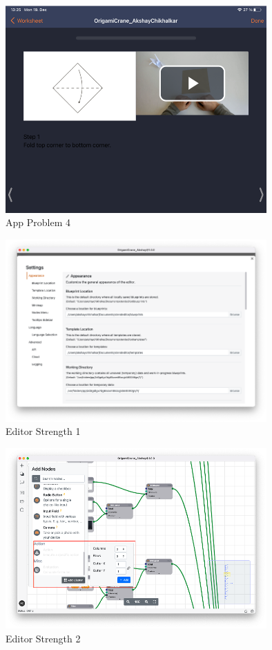 \documentclass[conference,onecolumn]{IEEEtran}
\begin{document}
    \begin{figure}[H]
        \centerline{\includegraphics[width=100mm,scale=1]{./images/App_Problem_4.png}}
        \caption{App Problem 4}
        \label{App Problem 4}
    \end{figure}
    \begin{figure}[H]
        \centerline{\includegraphics[width=100mm,scale=1]{./images/Editor_Strength_1.png}}
        \caption{Editor Strength 1}
        \label{Editor Strength 1}
    \end{figure}
    \begin{figure}[H]
        \centerline{\includegraphics[width=100mm,scale=1]{./images/Editor_Strength_2.png}}
        \caption{Editor Strength 2}
        \label{Editor Strength 2}
    \end{figure}
\end{document}

